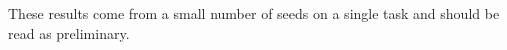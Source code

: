 These results come from a small number of seeds on a single task and should be read as preliminary.
